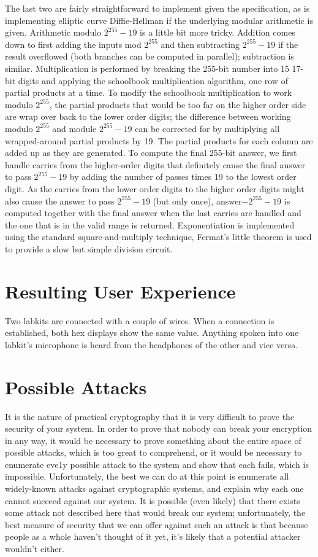 \documentclass[a4paper]{article}
\begin{document}
The last two are fairly straightforward to implement given the specification, as
is implementing elliptic curve Diffie-Hellman if the underlying modular
arithmetic is given. Arithmetic modulo $2^{255}-19$ is a little bit more
tricky. Addition comes down to first adding the inputs mod $2^{255}$ and then
subtracting $2^{255}-19$ if the result overflowed (both branches can be computed
in parallel); subtraction is similar.  Multiplication is performed by breaking
the 255-bit number into 15 17-bit digits and applying the schoolbook
multiplication algorithm, one row of partial products at a time. To modify the
schoolbook multiplication to work modulo $2^{255}$, the partial products that
would be too far on the higher order side are wrap over back to the lower order
digits; the difference between working modulo $2^{255}$ and module $2^{255}-19$
can be corrected for by multiplying all wrapped-around partial products by 19.
The partial products for each column are added up as they are generated. To
compute the final 255-bit answer, we first handle carries from the higher-order
digits that definitely cause the final answer to pass $2^{255}-19$ by adding the
number of passes times 19 to the lowest order digit. As the carries from the
lower order digits to the higher order digits might also cause the answer to
pass $2^{255}-19$ (but only once), answer$-2^{255}-19$ is computed together with
the final answer when the last carries are handled and the one that is in the
valid range is returned. Exponentiation is implemented using the standard
square-and-multiply technique, Fermat's little theorem is used to provide a slow
but simple division circuit.

\section{Resulting User Experience}

Two labkits are connected with a couple of wires. When a connection is
established, both hex displays show the same value. Anything spoken into one
labkit's microphone is heard from the headphones of the other and vice versa.

\section{Possible Attacks}

It is the nature of practical cryptography that it is very difficult to prove the security of your system. In order to prove that nobody can break your encryption in any way, it would be necessary to prove something about the entire space of possible attacks, which is too great to comprehend, or it would be necessary to enumerate eve1y possible attack to the system and show that each fails, which is impossible. Unfortunately, the best we can do at this point is enumerate all widely-known attacks against cryptographic systems, and explain why each one cannot succeed against our system. It is possible (even likely) that there exists some attack not described here that would break our system; unfortunately, the best measure of security that we can offer against such an attack is that because people as a whole haven't thought of it yet, it's likely that a potential attacker wouldn't either.
\end{document}
